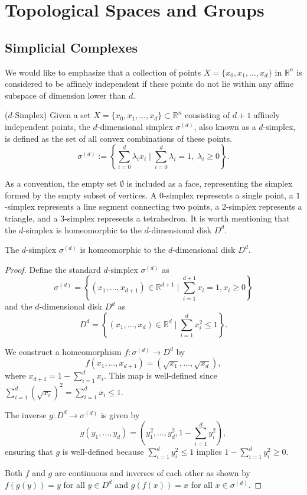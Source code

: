 \section{Topological Spaces and Groups}


\subsection{Simplicial Complexes}
\label{simplicialcomplexes}
We would like to emphasize that a collection of points $X = \{x_0, x_1, \ldots, x_d\}$ in $\mathbb{R}^n$ is considered to be affinely independent if these points do not lie within any affine subspace of dimension lower than $d$.

\begin{definition}{($d$-Simplex) \cite[§2.1]{boissonnat2018geometric}}
\label{d-simplex}
Given a set $X = \{x_0, x_1, \ldots, x_d\} \subset \mathbb{R}^n$ consisting of $d+1$ affinely independent points, the $d$-dimensional simplex $\sigma^{(d)}$, also known as a  $d$-simplex, is defined as the set of all convex combinations of these points.
\begin{equation}
	\sigma^{(d)} := \left\{\sum_{i=0}^{d} \lambda_i x_i \; \vert \; \sum_{i=0}^{d} \lambda_i = 1, \; \lambda_i \geq 0 \right\}.
\end{equation}
\end{definition}

As a convention, the empty set $\emptyset$ is included as a face, representing the simplex formed by the empty subset of vertices. A $0$-simplex represents a single point, a $1$-simplex represents a line segment connecting two points, a $2$-simplex represents a triangle, and a $3$-simplex represents a tetrahedron. It is worth mentioning that the $d$-simplex is homeomorphic to the $d$-dimensional disk $D^d$.

\begin{theorem}
The $d$-simplex $\sigma^{(d)}$ is homeomorphic to the $d$-dimensional disk $D^d$.
\end{theorem}

\begin{proof}
Define the standard $d$-simplex $\sigma^{(d)}$ as 
\[
\sigma^{(d)} = \left\{(x_1, \ldots, x_{d+1}) \in \mathbb{R}^{d+1} \mid \sum_{i=1}^{d+1} x_i = 1, x_i \geq 0 \right\}
\]
and the $d$-dimensional disk $D^d$ as 
\[
D^d = \left\{(x_1, \ldots, x_d) \in \mathbb{R}^d \mid \sum_{i=1}^d x_i^2 \leq 1\right\}.
\]

We construct a homeomorphism $f: \sigma^{(d)} \rightarrow D^d$ by
\[
f(x_1, \ldots, x_{d+1}) = (\sqrt{x_1}, \ldots, \sqrt{x_d}),
\]
where $x_{d+1} = 1 - \sum_{i=1}^d x_i$. This map is well-defined since $\sum_{i=1}^d (\sqrt{x_i})^2 = \sum_{i=1}^d x_i \leq 1$.

The inverse $g: D^d \rightarrow \sigma^{(d)}$ is given by
\[
g(y_1, \ldots, y_d) = (y_1^2, \ldots, y_d^2, 1 - \sum_{i=1}^d y_i^2),
\]
ensuring that $g$ is well-defined because $\sum_{i=1}^d y_i^2 \leq 1$ implies $1 - \sum_{i=1}^d y_i^2 \geq 0$.

Both $f$ and $g$ are continuous and inverses of each other as shown by $f(g(y)) = y$ for all $y \in D^d$ and $g(f(x)) = x$ for all $x \in \sigma^{(d)}$.
\end{proof}

